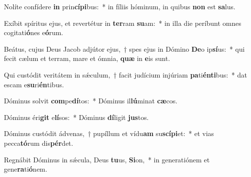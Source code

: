 \item Nolíte confídere \textbf{in} prin\textbf{cí}\textbf{pi}bus:~* in fíliis hóminum, in quibus \textbf{non} est \textbf{sa}lus.
\item Exíbit spíritus ejus, et revertétur in \textbf{ter}ram \textbf{su}am:~* in illa die períbunt omnes cogitati\textbf{ó}nes e\textbf{ó}rum.
\item Beátus, cujus Deus Jacob adjútor ejus,~† spes ejus in Dómino \textbf{De}o ip\textbf{sí}us:~* qui fecit cælum et terram, mare et ómnia, \textbf{quæ} in \textbf{e}is sunt.
\item Qui custódit veritátem in sǽculum,~† facit judícium injúriam \textbf{pa}ti\textbf{én}\textbf{ti}bus:~* dat escam e\textbf{su}ri\textbf{én}tibus.
\item Dóminus solvit \textbf{com}pe\textbf{dí}tos:~* Dóminus il\textbf{lú}minat \textbf{cæ}cos.
\item Dóminus éri\textbf{git} e\textbf{lí}sos:~* Dóminus \textbf{dí}ligit \textbf{jus}tos.
\item Dóminus custódit ádvenas,~† pupíllum et vídu\textbf{am} su\textbf{scí}\textbf{pi}et:~* et vias pecca\textbf{tó}rum dis\textbf{pér}det.
\item Regnábit Dóminus in sǽcula, Deus \textbf{tu}us, \textbf{Si}on,~* in generatiónem et gene\textbf{ra}ti\textbf{ó}nem.
